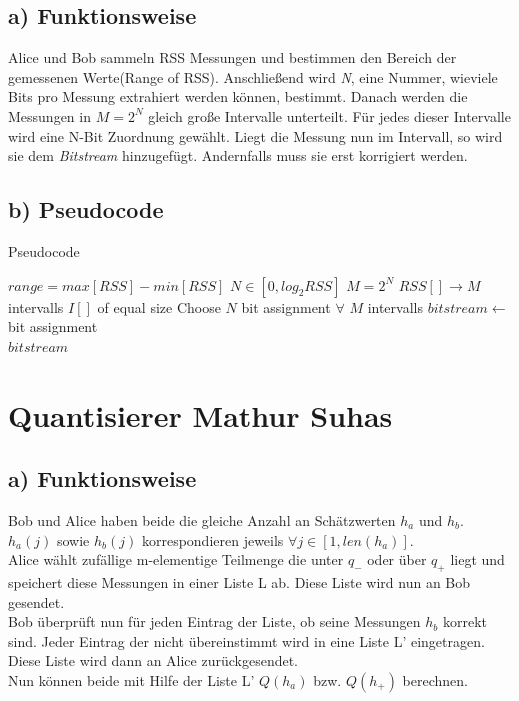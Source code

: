 \documentclass[12pt,a4paper]{article}
\begin{document}
\subsection*{a) Funktionsweise}
Alice und Bob sammeln RSS Messungen und bestimmen den Bereich der gemessenen Werte(Range of RSS). Anschließend wird \textit{N}, eine Nummer, wieviele Bits pro Messung extrahiert werden können, bestimmt. Danach werden die Messungen in $M = 2^N$ gleich große Intervalle unterteilt. Für jedes dieser Intervalle wird eine N-Bit Zuordnung gewählt. Liegt die Messung nun im Intervall, so wird sie dem \textit{Bitstream} hinzugefügt. Andernfalls muss sie erst korrigiert werden.

\subsection*{b) Pseudocode}
\begin{algorithm}
\caption{Pseudocode}
\begin{algorithmic}[1]
\State $range = max[RSS] - min[RSS]$
\State $N \in [0, log_2 RSS]$
\State $M = 2^N$
\State $RSS[] \to M$ intervalls $I[]$ of equal size
\State Choose $N$ bit assignment $\forall$ $M$ intervalls
\State $bitstream \gets$ bit assignment
\EndIf
\EndFor
\EndFor\\
\Return $bitstream$
\end{algorithmic}
\end{algorithm}

\newpage
\section{Quantisierer Mathur Suhas}
\subsection*{a) Funktionsweise}
Bob und Alice haben beide die gleiche Anzahl an Schätzwerten $h_a$ und $h_b$.\\
$h_a(j)$ sowie $h_b(j)$ korrespondieren jeweils $\forall j \in [1,len(h_a)]$.\\
Alice wählt zufällige m-elementige Teilmenge die unter $q_-$ oder über $q_+$ liegt und speichert diese Messungen in einer Liste L ab. Diese Liste wird nun an Bob gesendet.\\
Bob überprüft nun für jeden Eintrag der Liste, ob seine Messungen $h_b$ korrekt sind. Jeder Eintrag der nicht übereinstimmt wird in eine Liste L' eingetragen. Diese Liste wird dann an Alice zurückgesendet.\\
Nun können beide mit Hilfe der Liste L' $Q(h_a)$ bzw. $Q(h_+)$ berechnen.
\end{document}
